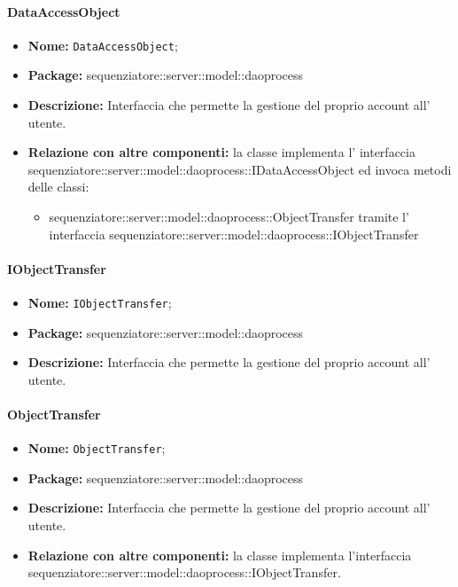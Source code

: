 \paragraph{DataAccessObject}
	\begin{itemize}
		\item \textbf{Nome:} \texttt{DataAccessObject};
		\item \textbf{Package:} sequenziatore::server::model::daoprocess
		\item \textbf{Descrizione:} Interfaccia che permette la gestione del proprio account all' utente.
		\item \textbf{Relazione con altre componenti:} la classe implementa l' interfaccia sequenziatore::server::model::daoprocess::IDataAccessObject ed invoca metodi delle classi:
		\begin{itemize}
			\item sequenziatore::server::model::daoprocess::ObjectTransfer tramite l' interfaccia sequenziatore::server::model::daoprocess::IObjectTransfer
	\end{itemize}
\end{itemize}
\paragraph{IObjectTransfer}
	\begin{itemize}
		\item \textbf{Nome:} \texttt{IObjectTransfer};
		\item \textbf{Package:} sequenziatore::server::model::daoprocess
		\item \textbf{Descrizione:} Interfaccia che permette la gestione del proprio account all' utente.
	\end{itemize}
\paragraph{ObjectTransfer}
	\begin{itemize}
		\item \textbf{Nome:} \texttt{ObjectTransfer};
		\item \textbf{Package:} sequenziatore::server::model::daoprocess
		\item \textbf{Descrizione:} Interfaccia che permette la gestione del proprio account all' utente.
		\item \textbf{Relazione con altre componenti:} la classe implementa l'interfaccia sequenziatore::server::model::daoprocess::IObjectTransfer.
	\end{itemize}
